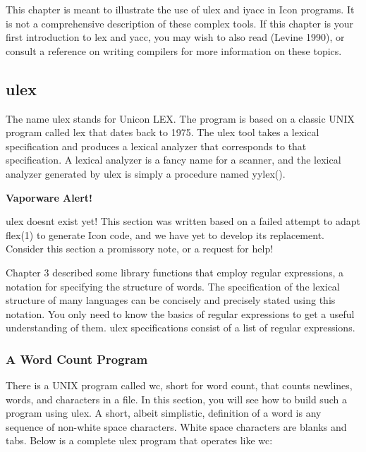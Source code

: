 This chapter is meant to illustrate the use of \textsf{ulex} and
\textsf{iyacc} in Icon programs. It is not a comprehensive description
of these complex tools. If this chapter is your first introduction to
\textsf{lex} and \textsf{yacc}, you may wish to also read (Levine
1990), or consult a reference on writing compilers for more information
on these topics.

\subsection{ulex}

The name \textsf{ulex} stands for Unicon LEX. The program is based on a
classic UNIX program called \textsf{lex} that dates back to 1975. The
\textsf{ulex} tool takes a lexical specification and produces a lexical
analyzer that corresponds to that specification. A lexical analyzer is a fancy name for a scanner, and the
lexical analyzer generated by \textsf{ulex} is simply a procedure named
\textsf{yylex()}.

{\sffamily\bfseries
Vaporware Alert!}

{\sffamily
ulex doesn{\textquotesingle}t exist yet! This section was written based
on a failed attempt to adapt flex(1) to generate Icon code, and we have
yet to develop its replacement. Consider this section a promissory
note, or a request for help!}

Chapter 3 described some library functions that employ regular expressions, a notation for specifying the structure
of words. The specification of the lexical structure of many languages
can be concisely and precisely stated using this notation. You only
need to know the basics of regular expressions to get a useful
understanding of them. \textsf{ulex} specifications consist of a list
of regular expressions.

\subsubsection{A Word Count Program}

There is a UNIX program called \textsf{wc}, short for word count, that counts newlines, words, and characters in a
file. In this section, you will see how to build such a program using
\textsf{ulex}. A short, albeit simplistic, definition of a word is any
sequence of non-white space characters. White space characters are
blanks and tabs. Below is a complete \textsf{ulex} program that
operates like \textsf{wc}:\\


